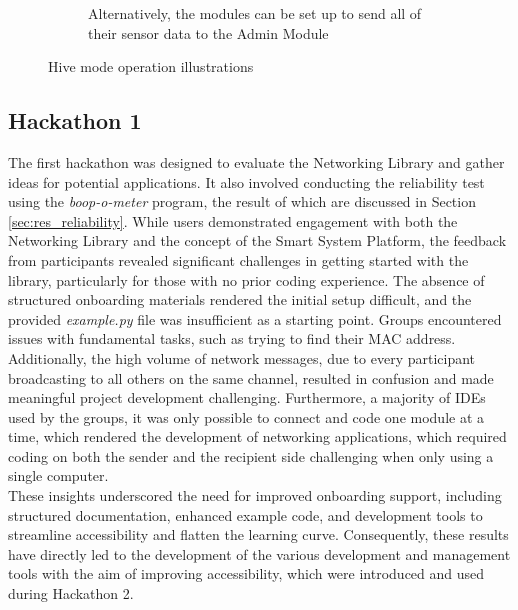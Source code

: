 \begin{figure}[H]
\begin{subfigure}{0.32\textwidth}
        \caption{Alternatively, the modules can be set up to send all of their sensor data to the Admin Module}
    \end{subfigure}
    \vspace{\ftspace}
    \caption{Hive mode operation illustrations}
    \vspace{\ftspace}
    \label{fig:hivemode}
\end{figure}

\subsection{\label{sec:res_hackathon1}Hackathon 1}

The first hackathon was designed to evaluate the Networking Library and gather ideas for potential applications. It also involved conducting the reliability test using the \textit{boop-o-meter} program, the result of which are discussed in Section \ref{sec:res_reliability}. While users demonstrated engagement with both the Networking Library and the concept of the Smart System Platform, the feedback from participants revealed significant challenges in getting started with the library, particularly for those with no prior coding experience. The absence of structured onboarding materials rendered the initial setup difficult, and the provided \textit{example.py} file was insufficient as a starting point. Groups encountered issues with fundamental tasks, such as trying to find their MAC address. Additionally, the high volume of network messages, due to every participant broadcasting to all others on the same channel, resulted in confusion and made meaningful project development challenging. Furthermore, a majority of IDEs used by the groups, it was only possible to connect and code one module at a time, which rendered the development of networking applications, which required coding on both the sender and the recipient side challenging when only using a single computer.\\

These insights underscored the need for improved onboarding support, including structured documentation, enhanced example code, and development tools to streamline accessibility and flatten the learning curve. Consequently, these results have directly led to the development of the various development and management tools with the aim of improving accessibility, which were introduced and used during Hackathon 2.\\

